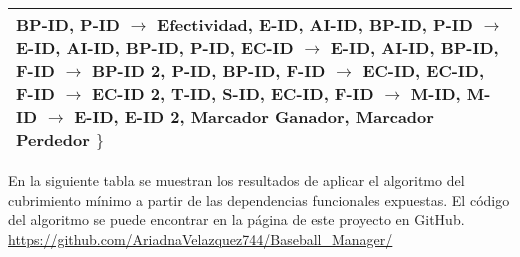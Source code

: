 \documentclass{report}
\begin{document}
\begin{tabularx}{\textwidth}{|X|}
        \hspace*{0.9cm} BP-ID, P-ID $\rightarrow$ Efectividad, \newline
        \hspace*{0.9cm} E-ID, AI-ID, BP-ID, P-ID $\rightarrow$ E-ID, AI-ID, BP-ID, P-ID, \newline
        \hspace*{0.9cm} EC-ID $\rightarrow$ E-ID, AI-ID, \newline
        \hspace*{0.9cm} BP-ID, F-ID $\rightarrow$ BP-ID 2, P-ID, \newline
        \hspace*{0.9cm} BP-ID, F-ID $\rightarrow$ EC-ID, \newline
        \hspace*{0.9cm} EC-ID, F-ID $\rightarrow$ EC-ID 2, T-ID, S-ID, \newline
        \hspace*{0.9cm} EC-ID, F-ID $\rightarrow$ M-ID, \newline
        \hspace*{0.9cm} M-ID $\rightarrow$ E-ID, E-ID 2, Marcador Ganador, Marcador Perdedor        
        $\} $
        \vspace*{0.15cm} \\    
        \bottomrule
    \end{tabularx}

    \vspace*{0.3cm}
    En la siguiente tabla se muestran los resultados de aplicar el algoritmo del cubrimiento mínimo a partir de las dependencias funcionales expuestas. 
    El código del algoritmo se puede encontrar en la página de este proyecto en GitHub. \url{https://github.com/AriadnaVelazquez744/Baseball_Manager/} 
\end{document}
